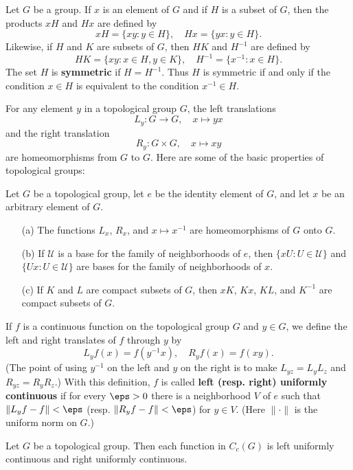 Let $G$ be a group. If $x$ is an element of $G$ and if $H$ is a subset of $G$, then the products $xH$ and $Hx$ are defined by
\[xH=\{xy:y\in H\},\quad Hx=\{yx:y\in H\}.\]
Likewise, if $H$ and $K$ are subsets of $G$, then $HK$ and $H^{-1}$ are defined by
\[HK=\{xy:x\in H,y\in K\},\quad H^{-1}=\{x^{-1}:x\in H\}.\]
The set $H$ is \textbf{symmetric} if $H=H^{-1}$. Thus $H$ is symmetric if and only if the condition $x\in H$ is equivalent to the condition $x^{-1}\in H$.\par
For any element $y$ in a topological group $G$, the left translations
\[L_y:G\to G,\quad x\mapsto yx\]
and the right translation
\[R_y:G\times G,\quad x\mapsto xy\]
are homeomorphisms from $G$ to $G$. Here are some of the basic properties of topological groups:
\begin{proposition}\label{topological group translation prop}
Let $G$ be a topological group, let $e$ be the identity element of $G$,
and let $x$ be an arbitrary element of $G$.
\begin{itemize}
\item[(a)] The functions $L_x$, $R_x$, and $x\mapsto x^{-1}$ are homeomorphisms of $G$ onto $G$.
\item[(b)] If $\mathcal{U}$ is a base for the family of neighborhoods of $e$, then $\{xU:U\in\mathcal{U}\}$ and $\{Ux:U\in\mathcal{U}\}$ are bases for the family of neighborhoods of $x$.
\item[(c)] If $K$ and $L$ are compact subsets of $G$, then $xK$, $Kx$, $KL$, and $K^{-1}$ are compact subsets of $G$.
\end{itemize}
\end{proposition}
If $f$ is a continuous function on the topological group $G$ and $y\in G$, we define the left and right translates of $f$ through $y$ by
\[L_yf(x)=f(y^{-1}x),\quad R_yf(x)=f(xy).\]
(The point of using $y^{-1}$ on the left and $y$ on the right is to make $L_{yz}=L_yL_z$ and $R_{yz}=R_yR_z$.) With this definition, $f$ is called \textbf{left (resp. right) uniformly continuous} if for every $\eps>0$ there is a neighborhood $V$ of $e$ such that $\|L_yf-f\|<\eps$ (resp. $\|R_yf-f\|<\eps$) for $y\in V$. (Here $\|\cdot\|$ is the uniform norm on $G$.)
\begin{proposition}\label{topological group uniformly continuous}
Let $G$ be a topological group. Then each function in $C_c(G)$ is left uniformly continuous and right uniformly continuous.
\end{proposition}
